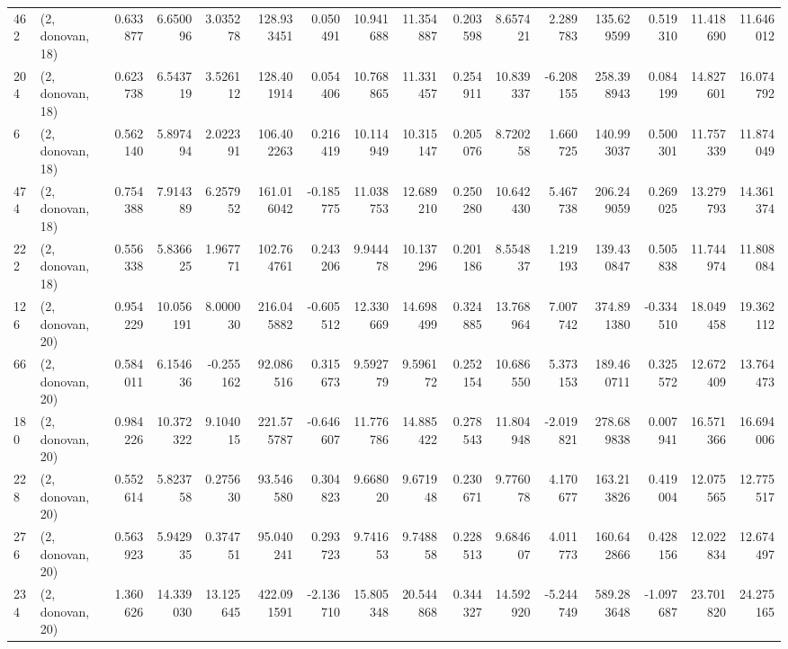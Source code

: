 \begin{tabular}{llrrrrrrrrrrrrrr}
462 &  (2, donovan, 18) &   0.633877 &   6.650096 &   3.035278 &   128.933451 &   0.050491 &  10.941688 &  11.354887 &  0.203598 &   8.657421 &   2.289783 &   135.629599 &   0.519310 &  11.418690 &  11.646012 \\
204 &  (2, donovan, 18) &   0.623738 &   6.543719 &   3.526112 &   128.401914 &   0.054406 &  10.768865 &  11.331457 &  0.254911 &  10.839337 &  -6.208155 &   258.398943 &   0.084199 &  14.827601 &  16.074792 \\
6   &  (2, donovan, 18) &   0.562140 &   5.897494 &   2.022391 &   106.402263 &   0.216419 &  10.114949 &  10.315147 &  0.205076 &   8.720258 &   1.660725 &   140.993037 &   0.500301 &  11.757339 &  11.874049 \\
474 &  (2, donovan, 18) &   0.754388 &   7.914389 &   6.257952 &   161.016042 &  -0.185775 &  11.038753 &  12.689210 &  0.250280 &  10.642430 &   5.467738 &   206.249059 &   0.269025 &  13.279793 &  14.361374 \\
222 &  (2, donovan, 18) &   0.556338 &   5.836625 &   1.967771 &   102.764761 &   0.243206 &   9.944478 &  10.137296 &  0.201186 &   8.554837 &   1.219193 &   139.430847 &   0.505838 &  11.744974 &  11.808084 \\
126 &  (2, donovan, 20) &   0.954229 &  10.056191 &   8.000030 &   216.045882 &  -0.605512 &  12.330669 &  14.698499 &  0.324885 &  13.768964 &   7.007742 &   374.891380 &  -0.334510 &  18.049458 &  19.362112 \\
66  &  (2, donovan, 20) &   0.584011 &   6.154636 &  -0.255162 &    92.086516 &   0.315673 &   9.592779 &   9.596172 &  0.252154 &  10.686550 &   5.373153 &   189.460711 &   0.325572 &  12.672409 &  13.764473 \\
180 &  (2, donovan, 20) &   0.984226 &  10.372322 &   9.104015 &   221.575787 &  -0.646607 &  11.776786 &  14.885422 &  0.278543 &  11.804948 &  -2.019821 &   278.689838 &   0.007941 &  16.571366 &  16.694006 \\
228 &  (2, donovan, 20) &   0.552614 &   5.823758 &   0.275630 &    93.546580 &   0.304823 &   9.668020 &   9.671948 &  0.230671 &   9.776078 &   4.170677 &   163.213826 &   0.419004 &  12.075565 &  12.775517 \\
276 &  (2, donovan, 20) &   0.563923 &   5.942935 &   0.374751 &    95.040241 &   0.293723 &   9.741653 &   9.748858 &  0.228513 &   9.684607 &   4.011773 &   160.642866 &   0.428156 &  12.022834 &  12.674497 \\
234 &  (2, donovan, 20) &   1.360626 &  14.339030 &  13.125645 &   422.091591 &  -2.136710 &  15.805348 &  20.544868 &  0.344327 &  14.592920 &  -5.244749 &   589.283648 &  -1.097687 &  23.701820 &  24.275165 \\

\end{tabular}
